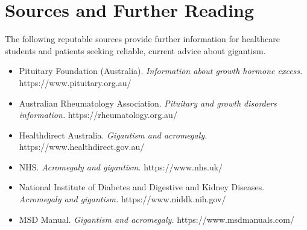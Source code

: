 \section*{Sources and Further Reading}
The following reputable sources provide further information for healthcare students and patients seeking reliable, current advice about gigantism.

\begin{itemize}
    \item Pituitary Foundation (Australia). \textit{Information about growth hormone excess.} https://www.pituitary.org.au/
    \item Australian Rheumatology Association. \textit{Pituitary and growth disorders information.} https://rheumatology.org.au/
    \item Healthdirect Australia. \textit{Gigantism and acromegaly.} https://www.healthdirect.gov.au/
    \item NHS. \textit{Acromegaly and gigantism.} https://www.nhs.uk/
    \item National Institute of Diabetes and Digestive and Kidney Diseases. \textit{Acromegaly and gigantism.} https://www.niddk.nih.gov/
    \item MSD Manual. \textit{Gigantism and acromegaly.} https://www.msdmanuals.com/
\end{itemize}
